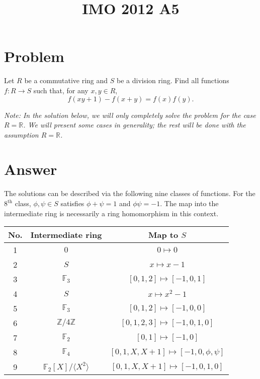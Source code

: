 \documentclass{article}
\title{IMO 2012 A5}
\author{}
\date{}
\newcommand{\F}{\mathbb{F}}
\newcommand{\R}{\mathbb{R}}
\newcommand{\Z}{\mathbb{Z}}
\begin{document}
\maketitle





\section*{Problem}

Let $R$ be a commutative ring and $S$ be a division ring.
Find all functions $f : R \to S$ such that, for any $x, y \in R$,
\[ f(xy + 1) - f(x + y) = f(x) f(y). \tag{*}\label{2012a5-eq0} \]

\textit{
    Note: In the solution below, we will only completely solve the problem for the case $R = \R$.
    We will present some cases in generality; the rest will be done with the assumption $R = \R$.}





\section*{Answer}

The solutions can be described via the following nine classes of functions.
For the $8^{\text{th}}$ class, $\phi, \psi \in S$ satisfies $\phi + \psi = 1$ and $\phi \psi = -1$.
The map into the intermediate ring is necessarily a ring homomorphism in this context.

\begin{table}[H]
\centering
\begin{tabular}{|c|c|c|}
    \hline
    No. & Intermediate ring & Map to $S$ \\ \hline
    1 & $0$ & $0 \mapsto 0$ \\ \hline
    2 & $S$ & $x \mapsto x - 1$ \\ \hline
    3 & $\F_3$ & $[0, 1, 2] \mapsto [-1, 0, 1]$ \\ \hline
    4 & $S$ & $x \mapsto x^2 - 1$ \\ \hline
    5 & $\F_3$ & $[0, 1, 2] \mapsto [-1, 0, 0]$ \\ \hline
    6 & $\Z/4\Z$ & $[0, 1, 2, 3] \mapsto [-1, 0, 1, 0]$ \\ \hline
    7 & $\F_2$ & $[0, 1] \mapsto [-1, 0]$ \\ \hline
    8 & $\F_4$ & $[0, 1, X, X + 1] \mapsto [-1, 0, \phi, \psi]$ \\ \hline
    9 & $\F_2[X]/\langle X^2 \rangle$ & $[0, 1, X, X + 1] \mapsto [-1, 0, 1, 0]$ \\ \hline
\end{tabular}
\end{table}
\end{document}
